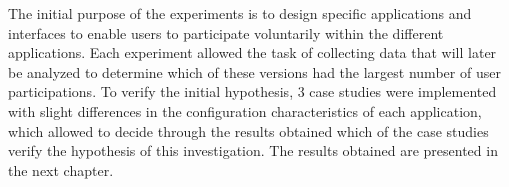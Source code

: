 The initial purpose of the experiments is to design specific applications and
interfaces to enable users to participate voluntarily within the different
applications. Each experiment allowed the task of collecting data that will
later be analyzed to determine which of these versions had the largest number of
user participations. To verify the initial hypothesis, 3 case studies were
implemented with slight differences in the configuration characteristics of each
application, which allowed to decide through the results obtained which of the
case studies verify the hypothesis of this investigation. The results obtained
are presented in the next chapter.

